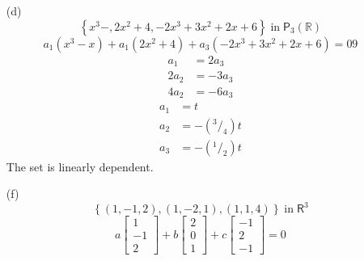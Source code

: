 \begin{enumerate}
\item[(d)]
\[
\left\{x^3 - , 2x^2 + 4, -2x^3 + 3x^2 + 2x +6\right\} \;\text{in}\;  \mathsf{P}_3\left(\mathbb{R}\right)
\]
\begin{equation}
a_1\left(x^3-x\right) +a_1\left(2x^2 + 4\right) + a_3\left(-2x^3
  +3x^2+2x+6\right) = 09
\end{equation}
\begin{align}
a_1 &= 2a_3\\
2a_2 &= -3a_3\\
4a_2 &= -6a_3
\end{align}
\begin{align}
a_1 &= t\\
a_2 &= -\left(^3/_4\right)t\\
a_3 &= -\left(^1/_2\right)t
\end{align}
The set is linearly dependent.
\newpage{}
\item[(f)]
\[
\left\{\left(1,-1,2\right),\left(1,-2,1\right),\left(1,1,4\right)\right\}
\;\text{in}\; \mathsf{R}^3
\]
\begin{equation}
a\begin{bmatrix}
1\\
-1\\
2
\end{bmatrix}
+ b\begin{bmatrix}
2\\
0\\
1
\end{bmatrix}
+ c\begin{bmatrix}
-1\\
2\\
-1
\end{bmatrix}
=0
\end{equation}


\end{enumerate}
